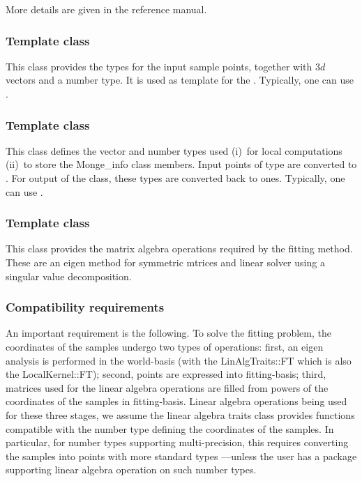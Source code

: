 More details are given in the reference manual.

\subsubsection{Template class }

This class provides the types for the input sample points, together
with $3d$ vectors and a number type. It is used as template for the
. Typically, one can use .

\subsubsection{Template class }

This class defines the vector and number types used (i)\ for local
computations (ii)\ to store the Monge\_info class members. Input
points of type  are converted to
. For output of the  class, these
types are converted back to  ones.  Typically, one can use
.

\subsubsection{Template class }

This class provides the matrix algebra operations required by the
fitting method. These are an eigen method for symmetric mtrices and
linear solver using a singular value decomposition.

\subsubsection{Compatibility requirements}

An important requirement is the following. To solve the fitting
problem, the coordinates of the samples undergo two types of
operations: first, an eigen analysis is performed in the world-basis
(with the LinAlgTraits::FT which is also the LocalKernel::FT); second,
points are expressed into fitting-basis; third, matrices used for the
linear algebra operations are filled from powers of the coordinates of
the samples in fitting-basis. Linear algebra operations being used for
these three stages, we assume the linear algebra traits class provides
functions compatible with the number type defining the coordinates of
the samples. In particular, for number types supporting
multi-precision, this requires converting the samples into points with
more standard types ---unless the user has a package supporting linear
algebra operation on such number types.





